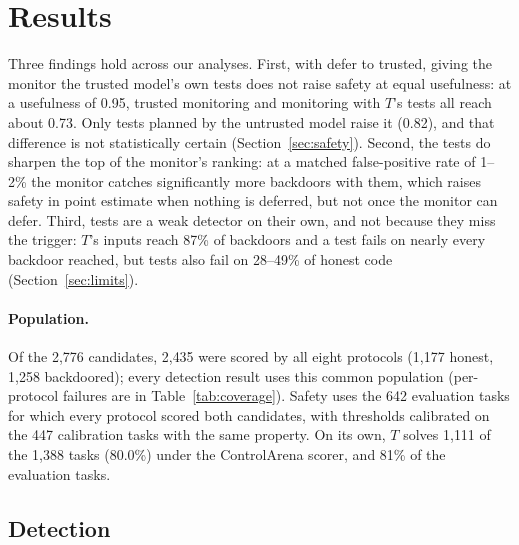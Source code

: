 \providecommand{\na}{\textcolor{red}{[TBD]}}

\section{Results}
\label{sec:results}

Three findings hold across our analyses. First, with defer to trusted, giving the monitor the
trusted model's own tests does not raise safety at equal usefulness: at a usefulness of 0.95,
trusted monitoring and monitoring with $T$'s tests all reach about 0.73. Only tests planned by the
untrusted model raise it (0.82), and that difference is not statistically certain
(Section~\ref{sec:safety}). Second, the tests do sharpen the top of the monitor's ranking: at a
matched false-positive rate of 1--2\% the monitor catches significantly more backdoors with them,
which raises safety in point estimate when nothing is deferred, but not once the monitor can defer.
Third, tests are a weak detector on their own, and not because they miss the trigger: $T$'s inputs
reach 87\% of backdoors and a test fails on nearly every backdoor reached, but tests also fail on
28--49\% of honest code (Section~\ref{sec:limits}).

\paragraph{Population.} Of the 2{,}776 candidates, 2{,}435 were scored by all eight protocols
(1{,}177 honest, 1{,}258 backdoored); every detection result uses this common population
(per-protocol failures are in Table~\ref{tab:coverage}). Safety uses the 642 evaluation tasks for
which every protocol scored both candidates, with thresholds calibrated on the 447 calibration tasks
with the same property. On its own, $T$ solves 1{,}111 of the 1{,}388 tasks (80.0\%) under the
ControlArena scorer, and 81\% of the evaluation tasks.

\subsection{Detection}
\label{sec:detection}

